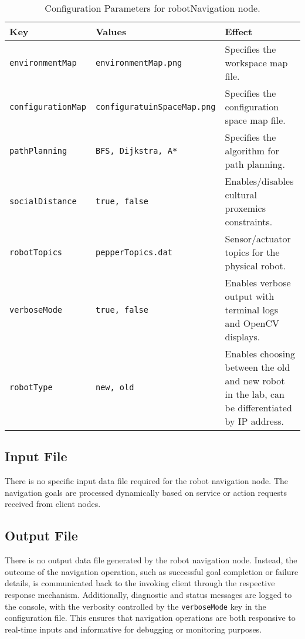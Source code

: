 \documentclass{CSSRforAfrica}
\begin{document}
\begin{table}[H]
\centering
\caption{Configuration Parameters for robotNavigation node.}
\label{tab:robotNavigationConfiguration.ini}
\begin{tabularx}{\textwidth}{|l|l|X|}
\hline
\textbf{Key} & \textbf{Values} & \textbf{Effect} \\ \hline
\verb|environmentMap| & \verb|environmentMap.png| & Specifies the workspace map file. \\ \hline
\verb|configurationMap| & \verb|configuratuinSpaceMap.png| & Specifies the configuration space map file. \\ \hline
\verb|pathPlanning| & \verb|BFS, Dijkstra, A*| & Specifies the algorithm for path planning. \\ \hline
\verb|socialDistance| & \verb|true, false| & Enables/disables cultural proxemics constraints. \\ \hline
\verb|robotTopics| & \verb|pepperTopics.dat| & Sensor/actuator topics for the physical robot. \\ \hline
\verb|verboseMode| & \verb|true, false| & Enables verbose output with terminal logs and OpenCV displays. \\ \hline
\verb|robotType| & \verb|new, old| & Enables choosing between the old and new robot in the lab, can be differentiated by IP address. \\ \hline
\end{tabularx}
\end{table}


\subsection*{Input File}
There is no specific input data file required for the robot navigation node. The navigation goals are processed dynamically based on service or action requests received from client nodes. 
\subsection*{Output File}
There is no output data file generated by the robot navigation node. Instead, the outcome of the navigation operation, such as successful goal completion or failure details, is communicated back to the invoking client through the respective response mechanism. Additionally, diagnostic and status messages are logged to the console, with the verbosity controlled by the \verb|verboseMode| key in the configuration file. This ensures that navigation operations are both responsive to real-time inputs and informative for debugging or monitoring purposes.
\end{document}
